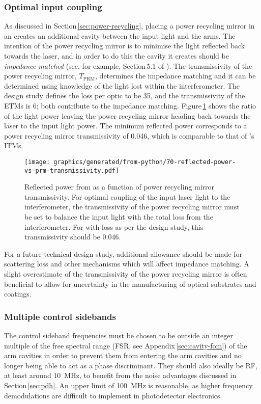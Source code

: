 \subsubsection{Optimal input coupling}
As discussed in Section\,\ref{sec:power-recycling}, placing a power recycling mirror in an \MI{} creates an additional cavity between the input light and the arms. The intention of the power recycling mirror is to minimise the light reflected back towards the laser, and in order to do this the cavity it creates should be \emph{impedance matched} (see, for example, Section\,5.1 of \cite{Freise2010}). The transmissivity of the power recycling mirror, $T_{\text{PRM}}$, determines the impedance matching and it can be determined using knowledge of the light lost within the interferometer. The design study defines the loss per optic to be \SI{35}{\ppm}, and the transmissivity of the \glspl{ETM} is \SI{6}{\ppm}; both contribute to the impedance matching. Figure\,\ref{fig:reflected-power-vs-prm-trans} shows the ratio of the light power leaving the power recycling mirror heading back towards the laser to the input light power. The minimum reflected power corresponds to a power recycling mirror transmissivity of \num{0.046}, which is comparable to that of \ETLF{}'s \glspl{ITM}.

\begin{figure}
  \centering
  \texttt{[image: graphics/generated/from-python/70-reflected-power-vs-prm-transmissivity.pdf]}
  \caption[Reflected power from \ETLF{} as a function of power recycling mirror transmissivity]{\label{fig:reflected-power-vs-prm-trans}Reflected power from \ETLF{} as a function of power recycling mirror transmissivity. For optimal coupling of the input laser light to the interferometer, the transmissivity of the power recycling mirror must be set to balance the input light with the total loss from the interferometer. For \ETLF{} with loss as per the design study, this transmissivity should be \num{0.046}.}
\end{figure}

For a future technical design study, additional allowance should be made for scattering loss and other mechanisms which will affect impedance matching. A slight overestimate of the transmissivity of the power recycling mirror is often beneficial to allow for uncertainty in the manufacturing of optical substrates and coatings.

\subsubsection{\label{sec:multiple-control-sidebands}Multiple control sidebands}
The control sideband frequencies must be chosen to be outside an integer multiple of the free spectral range (\gls{FSR}, see Appendix\,\ref{sec:cavity-fom}) of the arm cavities in order to prevent them from entering the arm cavities and no longer being able to act as a phase discriminant. They should also ideally be \gls{RF}, at least around \SI{10}{\mega\hertz}, to benefit from the noise advantages discussed in Section\,\ref{sec:pdh}. An upper limit of \SI{100}{\mega\hertz} is reasonable, as higher frequency demodulations are difficult to implement in photodetector electronics.


